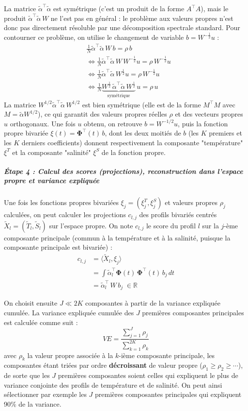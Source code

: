 \documentclass{article}
\begin{document}
	La matrice $\tilde\alpha^\top\tilde\alpha$ est symétrique (c'est un produit de la forme $A^\top A$), mais le produit $\tilde\alpha^\top\tilde\alpha\, W$ ne l'est pas en général : le problème aux valeurs propres n'est donc pas directement résoluble par une décomposition spectrale standard. Pour contourner ce problème, on utilise le changement de variable $b = W^{-\frac{1}{2}} u$ :
	\begin{align*}
		& \frac 1 N \tilde{\alpha}^\top \tilde{\alpha}\, W\, b = \rho\, b\\
		& \iff \frac 1 N \tilde{\alpha}^\top \tilde{\alpha}\, W\, W^{-\frac 1 2}u = \rho\, W^{-\frac 1 2}u\\
		& \iff \frac 1 N \tilde{\alpha}^\top \tilde{\alpha}\, W^{\frac{1}{2}} u = \rho\, W^{-\frac{1}{2}} u \\
		& \iff \frac 1 N \underbrace{W^{\frac 1 2}\, \tilde{\alpha}^\top \tilde{\alpha}\, W^{\frac 1 2}}_{\text{symétrique}}\, u = \rho\, u
	\end{align*}
	La matrice $W^{1/2}\tilde\alpha^\top\tilde\alpha\, W^{1/2}$ est bien symétrique (elle est de la forme $M^\top M$ avec $M = \tilde\alpha W^{1/2}$), ce qui garantit des valeurs propres réelles $\rho$ et des vecteurs propres $u$ orthogonaux. Une fois $u$ obtenu, on retrouve $b = W^{-1/2} u$, puis la fonction propre bivariée $\xi(t) = \boldsymbol{\Phi}^\top(t)\, b$, dont les deux moitiés de $b$ (les $K$ premiers et les $K$ derniers coefficients) donnent respectivement la composante "température" $\xi^T$ et la composante "salinité" $\xi^S$ de la fonction propre.
	
	\subparagraph{Étape 4 : Calcul des scores (projections), reconstruction dans l'espace propre et variance expliquée}
	Une fois les fonctions propres bivariées $\xi_j = (\xi_j^T, \xi_j^S)$ et valeurs propres $\rho_j$ calculées, on peut calculer les projections $c_{l,j}$ des profils bivariés centrés $\tilde X_l = (\tilde T_l, \tilde S_l)$ sur l'espace propre. On note $c_{l,j}$ le score du profil $l$ sur la $j$-ème composante principale (commun à la température et à la salinité, puisque la composante principale est bivariée) :
	\begin{align*}
		c_{l, j} &= \langle \tilde X_l, \xi_j\rangle \\
		&= \int \tilde\alpha_l^\top \boldsymbol{\Phi}(t)\, \boldsymbol{\Phi}^\top(t)\, b_j \, dt \\ 
		&= \tilde \alpha_l^\top\, W\, b_j \;\in \mathbb{R}
	\end{align*}
	
	On choisit ensuite $J \ll 2K$ composantes à partir de la variance expliquée cumulée. La variance expliquée cumulée des $J$ premières composantes principales est calculée comme suit :
	\[
	VE = \frac{\sum_{j=1}^{J}\rho_j}{\sum_{k=1}^{2K} \rho_k}	
	\]
	avec $\rho_k$ la valeur propre associée à la $k$-ième composante principale, les composantes étant triées par ordre \textbf{décroissant} de valeur propre ($\rho_1 \geq \rho_2 \geq \cdots$), de sorte que les $J$ premières composantes soient celles qui expliquent le plus de variance conjointe des profils de température et de salinité. On peut ainsi sélectionner par exemple les $J$ premières composantes principales qui expliquent 90\% de la variance.
	
\end{document}
